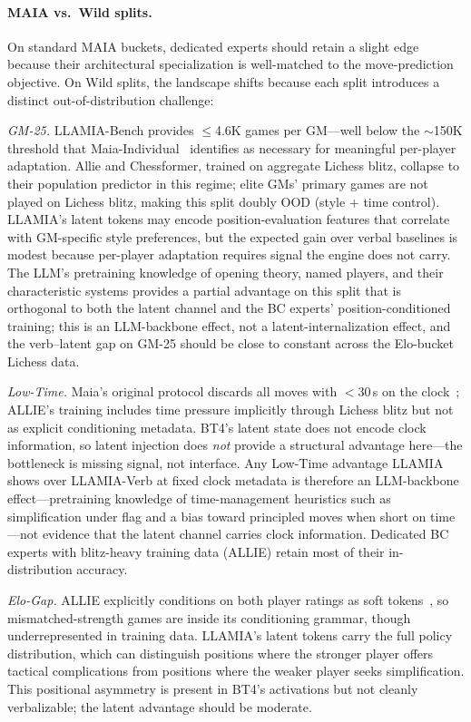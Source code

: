 \paragraph{MAIA vs.\ Wild splits.}
On standard MAIA buckets, dedicated experts should retain a slight edge
because their architectural specialization is well-matched to the
move-prediction objective.
On Wild splits, the landscape shifts because each split introduces a distinct
out-of-distribution challenge:

\emph{GM-25.}
LLAMIA-Bench provides ${\leq}$4.6K games per GM---well below the
${\sim}$150K threshold that Maia-Individual~\cite{XXX_maia_individual}
identifies as necessary for meaningful per-player adaptation.
Allie and Chessformer, trained on aggregate Lichess blitz, collapse to their
population predictor in this regime; elite GMs' primary games are not played
on Lichess blitz, making this split doubly OOD (style + time control).
LLAMIA's latent tokens may encode position-evaluation features that
correlate with GM-specific style preferences, but the expected gain over
verbal baselines is modest because per-player adaptation requires signal
the engine does not carry.
The LLM's pretraining knowledge of opening theory, named players, and
their characteristic systems provides a partial advantage on this split
that is orthogonal to both the latent channel and the BC experts'
position-conditioned training; this is an LLM-backbone effect, not a
latent-internalization effect, and the verb--latent gap on GM-25 should
be close to constant across the Elo-bucket Lichess data.

\emph{Low-Time.}
Maia's original protocol discards all moves with ${<}$30\,s on the
clock~\cite{mcilroy2022aligning}; ALLIE's training includes time pressure
implicitly through Lichess blitz but not as explicit conditioning metadata.
BT4's latent state does not encode clock information, so latent injection
does \emph{not} provide a structural advantage here---the bottleneck is
missing signal, not interface.
Any Low-Time advantage LLAMIA shows over LLAMIA-Verb at fixed clock
metadata is therefore an LLM-backbone effect---pretraining knowledge of
time-management heuristics such as simplification under flag and a bias
toward principled moves when short on time---not evidence that the
latent channel carries clock information.
Dedicated BC experts with blitz-heavy training data (ALLIE) retain most
of their in-distribution accuracy.

\emph{Elo-Gap.}
ALLIE explicitly conditions on both player ratings as soft
tokens~\cite{zhang2024humanalignedchessbitsearch}, so mismatched-strength
games are inside its conditioning grammar, though underrepresented in
training data.
LLAMIA's latent tokens carry the full policy distribution, which can
distinguish positions where the stronger player offers tactical
complications from positions where the weaker player seeks simplification.
This positional asymmetry is present in BT4's activations but not cleanly
verbalizable; the latent advantage should be moderate.

